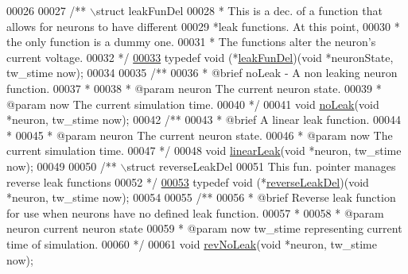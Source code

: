 \begin{DoxyCode}
00026 
00027 \textcolor{comment}{/** \(\backslash\)struct leakFunDel}
00028 \textcolor{comment}{ *  This is a dec. of a function that allows for neurons to have different}
00029 \textcolor{comment}{ *leak functions. At this point,}
00030 \textcolor{comment}{ *  the only function is a dummy one.}
00031 \textcolor{comment}{ *  The functions alter the neuron's current voltage.}
00032 \textcolor{comment}{ */}
\hypertarget{neuron_8h_source_l00033}{}\hyperlink{neuron_8h_a7362d32c8d9b6dc323f5d1b05af9855b}{00033} \textcolor{keyword}{typedef} \textcolor{keywordtype}{void} (*\hyperlink{neuron_8h_a7362d32c8d9b6dc323f5d1b05af9855b}{leakFunDel})(\textcolor{keywordtype}{void} *neuronState, tw\_stime now);
00034 
00035 \textcolor{comment}{/**}
00036 \textcolor{comment}{ *  @brief  noLeak - A non leaking neuron function.}
00037 \textcolor{comment}{ *}
00038 \textcolor{comment}{ *  @param neuron The current neuron state.}
00039 \textcolor{comment}{ *  @param now The current simulation time.}
00040 \textcolor{comment}{ */}
00041 \textcolor{keywordtype}{void} \hyperlink{neuron_8h_a8e52befc10f975c6be39cc93af573d7e}{noLeak}(\textcolor{keywordtype}{void} *neuron, tw\_stime now);
00042 \textcolor{comment}{/**}
00043 \textcolor{comment}{ *  @brief  A linear leak function.}
00044 \textcolor{comment}{ *}
00045 \textcolor{comment}{ *  @param neuron The current neuron state.}
00046 \textcolor{comment}{ *  @param now The current simulation time.}
00047 \textcolor{comment}{ */}
00048 \textcolor{keywordtype}{void} \hyperlink{neuron_8h_a64dc379b459a2b07b40bce35381210e8}{linearLeak}(\textcolor{keywordtype}{void} *neuron, tw\_stime now);
00049 
00050 \textcolor{comment}{/** \(\backslash\)struct reverseLeakDel}
00051 \textcolor{comment}{ This fun. pointer manages reverse leak functions}
00052 \textcolor{comment}{ */}
\hypertarget{neuron_8h_source_l00053}{}\hyperlink{neuron_8h_abf61b10b4b6116161a9e5c9d7ac54be1}{00053} \textcolor{keyword}{typedef} \textcolor{keywordtype}{void} (*\hyperlink{neuron_8h_abf61b10b4b6116161a9e5c9d7ac54be1}{reverseLeakDel})(\textcolor{keywordtype}{void} *neuron, tw\_stime now);
00054 
00055 \textcolor{comment}{/**}
00056 \textcolor{comment}{ *  @brief  Reverse leak function for use when neurons have no defined leak function.}
00057 \textcolor{comment}{ *}
00058 \textcolor{comment}{ *  @param neuron current neuron state}
00059 \textcolor{comment}{ *  @param now         tw\_stime representing current time of simulation.}
00060 \textcolor{comment}{ */}
00061 \textcolor{keywordtype}{void} \hyperlink{neuron_8h_ac5bebec77c5216533ec5f6acd086532e}{revNoLeak}(\textcolor{keywordtype}{void} *neuron, tw\_stime now);

\end{DoxyCode}
